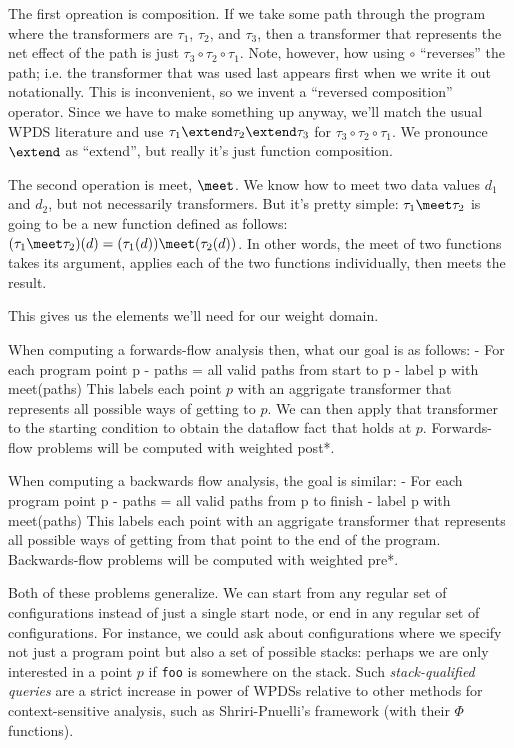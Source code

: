 \documentclass{article}
\newcommand{\code}[1]{\texttt{#1}}
\begin{document}
\begin{defintion}
The first opreation is composition. If we take some path through the
program where the transformers are $\tau_1$, $\tau_2$, and $\tau_3$,
then a transformer that represents the net effect of the path is just
$\tau_3 \circ \tau_2 \circ \tau_1$. Note, however, how using $\circ$
``reverses'' the path; i.e. the transformer that was used last appears
first when we write it out notationally. This is inconvenient, so we
invent a ``reversed composition'' operator. Since we have to make
something up anyway, we'll match the usual WPDS literature and use
$\tau_1 \extend \tau_2 \extend \tau_3$ for $\tau_3 \circ \tau_2 \circ
\tau_1$. We pronounce $\extend$ as ``extend'', but really it's just
function composition.

The second operation is meet, $\meet$. We know how to meet two data
values $d_1$ and $d_2$, but not necessarily transformers. But it's
pretty simple: $\tau_1 \meet \tau_2$ is going to be a new function
defined as follows: $(\tau_1 \meet \tau_2)(d) = (\tau_1(d)) \meet
(\tau_2(d))$. In other words, the meet of two functions takes its
argument, applies each of the two functions individually, then meets
the result.

This gives us the elements we'll need for our weight domain. 

When computing a forwards-flow analysis then, what our goal is as
follows:
    - For each program point p
        - paths = {all valid paths from start to p}
        - label p with meet(paths)
This labels each point $p$ with an aggrigate transformer that
represents all possible ways of getting to $p$. We can then apply that
transformer to the starting condition to obtain the dataflow fact that
holds at $p$. Forwards-flow problems will be computed with weighted
post*.

When computing a backwards flow analysis, the goal is similar:
    - For each program point p
        - paths = {all valid paths from p to finish}
        - label p with meet(paths)
This labels each point with an aggrigate transformer that represents
all possible ways of getting from that point to the end of the
program. Backwards-flow problems will be computed with weighted pre*.

Both of these problems generalize. We can start from any regular set
of configurations instead of just a single start node, or end in any
regular set of configurations. For instance, we could ask about
configurations where we specify not just a program point but also a
set of possible stacks: perhaps we are only interested in a point $p$
if \code{foo} is somewhere on the stack.  Such \emph{stack-qualified
  queries} are a strict increase in power of WPDSs relative to other
methods for context-sensitive analysis, such as Shriri-Pnuelli's
framework (with their $\Phi$ functions).



\end{defintion}
\end{document}
